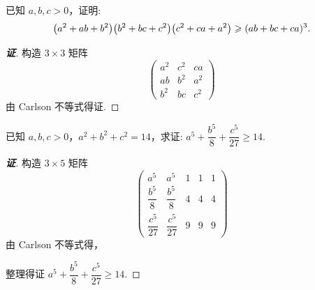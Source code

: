 \begin{example}
    已知 $a,b,c>0$，证明: $$\qty(a^2+ab+b^2)\qty(b^2+bc+c^2)\qty(c^2+ca+a^2)\geqslant (ab+bc+ca)^3.$$
\end{example}
\begin{proof}[{\songti \textbf{证}}]
    构造 $3\times 3$ 矩阵
    $$\begin{pmatrix}
            a^2 & c^2 & ca  \\
            ab  & b^2 & a^2 \\
            b^2 & bc  & c^2
        \end{pmatrix}$$
    由 Carlson 不等式得证.
\end{proof}

\begin{example}
    已知 $a,b,c>0$，$a^2+b^2+c^2=14$，求证: $a^5+\dfrac{b^5}{8}+\dfrac{c^5}{27}\geqslant 14.$
\end{example}
\begin{proof}[{\songti \textbf{证}}]
    构造 $3\times 5$ 矩阵
    $$\begin{pmatrix}
            a^5             & a^5             & 1 & 1 & 1 \\[6pt]
            \dfrac{b^5}{8}  & \dfrac{b^5}{8}  & 4 & 4 & 4 \\[6pt]
            \dfrac{c^5}{27} & \dfrac{c^5}{27} & 9 & 9 & 9
        \end{pmatrix}$$
    由 Carlson 不等式得，
    整理得证 $a^5+\dfrac{b^5}{8}+\dfrac{c^5}{27}\geqslant 14.$
\end{proof}

